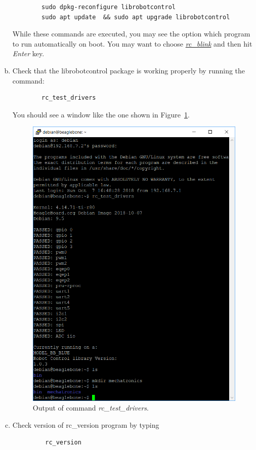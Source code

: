 \begin{enumerate}[a)]
    \begin{verbatim}
        sudo dpkg-reconfigure librobotcontrol
        sudo apt update  && sudo apt upgrade librobotcontrol
    \end{verbatim}
    While these commands are executed, you may see the option which program to run automatically on boot. You may want to choose \ul{\emph{rc\_blink}} and then hit \emph{Enter} key. 
    \item Check that the librobotcontrol package is working properly by running the command: %
%    
    \begin{verbatim}
        rc_test_drivers
    \end{verbatim}
    You should see a window like the one shown in Figure~\ref{fig:rcTestDriver}.
    \begin{figure}
        \centering
        \includegraphics{figs/img/Lab0/rcTestDriver}
        \caption{Output of command \emph{rc\_test\_drivers}.}
        \label{fig:rcTestDriver}
    \end{figure}
    \item Check version of rc\_version program by typing
    \begin{verbatim}
         rc_version
    \end{verbatim}
    
    \end{enumerate}
    
